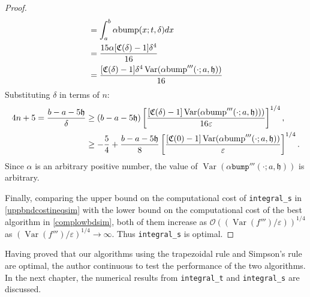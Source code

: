 \documentclass{iitthesis}
\DeclareMathOperator{\Var}{Var}
\theoremstyle{definition}
\theoremstyle{remark}
\begin{document}
\begin{proof}
\begin{subequations}
\begin{align*}
     &=\int_{a}^{b}\alpha\textup{bump}(x;t,\delta)dx\\
     &=\frac{15\alpha[\mathfrak{C}(\delta)-1]\delta^4}{16}\\
     &=\frac{[\mathfrak{C}(\delta)-1]\delta^4\Var(\alpha\textup{bump}'''(\cdot;a,\mathfrak{h}))}{16}
  \end{align*}
  \end{subequations}
  Substituting $\delta$  in terms of $n$:
      \begin{align*}
        4n+5=\frac{b-a-5\mathfrak{h}}{\delta}&\ge(b-a-5\mathfrak{h})\left[\frac{[\mathfrak{C}(\delta)-1]\Var(\alpha \textup{bump}'''(\cdot;a,\mathfrak{h})))}{16\varepsilon}\right]^{1/4},\\
        &\ge-\frac{5}{4}+\frac{b-a-5\mathfrak{h}}{8}\left[\frac{[\mathfrak{C}(0)-1]\Var(\alpha \textup{bump}'''(\cdot;a,\mathfrak{h}))}{\varepsilon}\right]^{1/4}.
    \end{align*}
    Since $\alpha$ is an arbitrary positive number, the value of $\Var(\alpha \texttt{bump}'''(\cdot;a,\mathfrak{h}))$ is arbitrary.

    Finally, comparing the upper bound on the computational cost of {\tt integral\_s} in \eqref{uppbndcostineqsim} with the lower bound on the computational cost of the best algorithm in \eqref{complowbdsim}, both of them increase as $\mathcal{O}((\Var(f''')/\varepsilon))^{1/4}$ as $(\Var(f''')/\varepsilon)^{1/4}\rightarrow \infty$. Thus {\tt integral\_s} is optimal.
\end{proof}

Having proved that our algorithms using the trapezoidal rule and Simpson's rule are optimal, the author continuous to test the performance of the two algorithms. In the next chapter, the numerical results from {\tt integral\_t} and {\tt integral\_s} are discussed.

\end{document}
